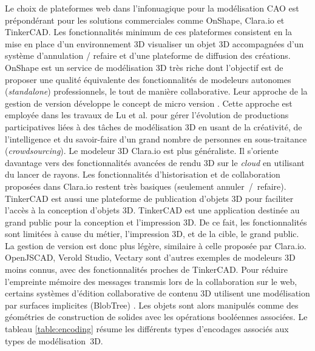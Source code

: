 %
Le choix de plateformes web dans l'infonuagique pour la modélisation \gls{CAO} 
est prépondérant pour les solutions commerciales comme OnShape, Clara.io et 
TinkerCAD. Les fonctionnalités minimum de ces plateformes consistent en la 
mise en place d'un environnement 3D visualiser un objet 3D accompagnées d'un 
système d'annulation / refaire et d'une plateforme de 
diffusion des créations.
OnShape est un service de modélisation 3D très riche dont l'objectif est de 
proposer une qualité équivalente des fonctionnalités de modeleurs autonomes 
(\textit{standalone}) professionnels, le tout de manière collaborative. Leur approche 
de la gestion de version développe le concept de micro version \cite{Baran2015}. 
Cette approche est employée dans les travaux de Lu et al. \cite{Lu2016} pour 
gérer l'évolution de productions participatives liées à des tâches de modélisation 
3D en usant de la créativité, de l'intelligence et du savoir-faire 
d'un grand nombre de personnes en sous-traitance (\textit{crowdsourcing}). 
Le modeleur 3D Clara.io \cite{Houston2013} est plus généraliste. Il s'oriente 
davantage vers des fonctionnalités avancées de rendu 3D sur le \textit{cloud} en 
utilisant du lancer de rayons. 
Les fonctionnalités d'historisation et de collaboration proposées 
dans Clara.io restent très basiques (seulement annuler~/~refaire). TinkerCAD 
est aussi une plateforme de publication d'objets 3D pour faciliter l'accès à la 
conception d'objets 3D. 
TinkerCAD est une application destinée au grand 
public pour la conception et l'impression 3D. De ce fait, les fonctionnalités sont 
limitées à cause du métier, l'impression 3D, et de la cible, le grand public. La gestion 
de version est donc plus légère, similaire à celle proposée par Clara.io. 
OpenJSCAD, Verold Studio, Vectary sont d'autres 
exemples de modeleurs 3D moins connus, avec des fonctionnalités proches de 
TinkerCAD.
Pour réduire l'empreinte mémoire des messages transmis lors de la collaboration 
sur le web, certains systèmes d'édition collaborative de contenu 3D utilisent une 
modélisation par surfaces implicites (BlobTree) \cite{Grasberger2013}. 
Les objets sont alors manipulés comme des géométries de construction de 
solides avec les opérations booléennes associées. Le tableau \ref{table:encoding} 
résume les différents types 
d'encodages associés aux types de modélisation~3D. 


